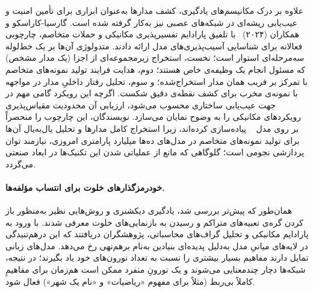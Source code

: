 علاوه بر درک مکانیسم‌های یادگیری، کشف مدارها به‌عنوان ابزاری برای تأمین امنیت و عیب‌یابی ریشه‌ای در شبکه‌های عصبی نیز به‌کار گرفته شده است. گارسیا-کاراسکو و همکاران (۲۰۲۴)~\cite{ijcai2024detecting} با تلفیق پارادایم تفسیرپذیری مکانیکی و حملات متخاصم، چارچوبی فعالانه برای شناسایی آسیب‌پذیری‌های مدل ارائه دادند. متدولوژی آن‌ها بر یک خط‌لوله سه‌مرحله‌ای استوار است؛ نخست، استخراج زیرمجموعه‌ای از اجزا (یک مدار مشخص) که مسئول انجام یک وظیفه‌ی خاص هستند؛ دوم، هدایت فرایند تولید نمونه‌های متخاصم با تمرکز بر فریب همان مدار استخراج‌شده؛ و سوم، تحلیل رفتار داخلیِ مدار در مواجهه با نمونه‌ی مخرب برای کشف نقطه‌ی دقیق شکست. اگرچه این رویکرد گامی مهم در جهت عیب‌یابی ساختاری محسوب می‌شود، ارزیابی آن محدودیت مقیاس‌پذیری رویکردهای مکانیکی را به وضوح نمایان می‌سازد. نویسندگان، این چارچوب را منحصراً بر روی مدل ~\cite{radford2019language} پیاده‌سازی کرده‌اند، زیرا استخراج کامل مدارها و تحلیل یال‌به‌یال آن‌ها برای تولید نمونه‌های متخاصم در مدل‌های ده‌ها میلیارد پارامتری امروزی، نیازمند توان پردازشی نجومی است؛ گلوگاهی که مانع از عملیاتی شدن این تکنیک‌ها در ابعاد صنعتی می‌گردد.

\paragraph{خودرمزگذارهای خلوت برای انتساب مؤلفه‌ها.}

همان‌طور که پیش‌تر بررسی شد، یادگیری دیکشنری و روش‌هایی نظیر  به‌منظور باز کردن گره‌ی تعبیه‌های متراکم و رسیدن به بازنمایی‌های خلوت معرفی شدند. با ورود به پارادایم مکانیکی و تحلیل گراف‌های محاسباتی، پژوهشگران دریافتند که این درهم‌تنیدگی در لایه‌های میانیِ مدل به‌دلیل پدیده‌ای بنیادین به‌نام برهم‌نهی رخ می‌دهد. مدل‌های زبانی تمایل دارند مفاهیم بسیار بیشتری را نسبت به تعداد نورون‌های خود یاد بگیرند؛ در نتیجه، شبکه‌ها دچار چندمعنایی می‌شوند و یک نورونِ منفرد ممکن است هم‌زمان برای مفاهیمِ کاملاً بی‌ربط (مثلاً برای مفهوم «ریاضیات» و «نام یک شهر») فعال شود.

